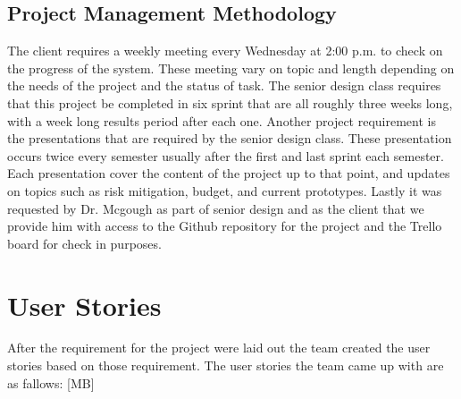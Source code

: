 \subsection{Project  Management Methodology}
The client requires a weekly meeting every Wednesday at 2:00 p.m. to check on the progress of the system. These meeting vary on topic and length depending on the needs of the project and the status of task. The senior design class requires that this project be completed in six sprint that are all roughly three weeks long, with a week long results period after each one. Another project requirement is the presentations that are required by the senior design class. These presentation occurs twice every semester usually after the first and last sprint each semester. Each presentation cover the content of the project up to that point, and updates on topics such as risk mitigation, budget, and current prototypes. Lastly it was requested by Dr. Mcgough as part of senior design and as the client that we provide him with access to the Github repository for the project and the Trello board for check in purposes.
 


\section{User Stories}
After the requirement for the project were laid out the team created the user stories based on those requirement. The user stories the team came up with are as fallows: [MB]

